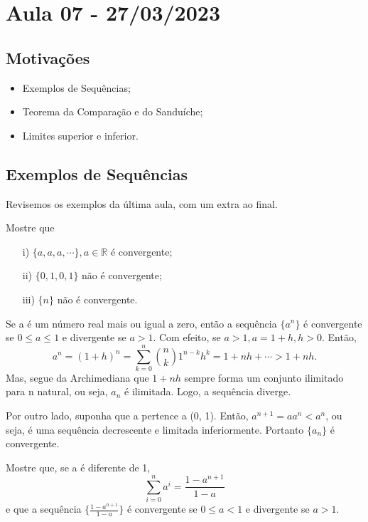 \documentclass[Analysis/analysis_notes.tex]{subfiles}
\begin{document}
\section{Aula 07 - 27/03/2023}
\subsection{Motiva\c c\~oes}
\begin{itemize}
	\item Exemplos de Sequ\^encias;
	\item Teorema da Compara\c c\~ao e do Sandu\'iche;
	\item Limites superior e inferior.
\end{itemize}
\subsection{Exemplos de Sequ\^encias}
Revisemos os exemplos da \'ultima aula, com um extra ao final.
\begin{example}
	Mostre que
	\begin{itemize}
		\item[i)] $\{a, a, a, \cdots\},a\in \mathbb{R}$ \'e convergente;
		\item[ii)] $\{0, 1, 0, 1\}$ n\~ao \'e convergente;
		\item[iii)] $\{n\}$ n\~ao \'e convergente.
	\end{itemize}
\end{example}
\begin{example}
	Se a \'e um n\'umero real mais ou igual a zero, ent\~ao a sequ\^encia $\{a^{n}\}$ \'e convergente se $0\leq{a}\leq{1}$ e divergente
	se $a > 1$. Com efeito, se $a > 1, a = 1 + h, h > 0$. Ent\~ao,
	$$
		a^{n} = (1+h)^{n} = \sum\limits_{k=0}^{n}\binom{n}{k}1^{n-k}h^{k} = 1 + nh + \cdots > 1 + nh.
	$$
	Mas, segue da Archimediana que $1 + nh$ sempre forma um conjunto ilimitado para n natural, ou seja, $a_{n}$ \'e ilimitada. Logo, a sequ\^encia
	diverge.

	Por outro lado, suponha que a pertence a (0, 1). Ent\~ao, $a^{n+1} = a a^{n} < a^{n}$, ou seja, \'e uma sequ\^encia decrescente e limitada inferiormente.
	Portanto $\{a_{n}\}$ \'e convergente.
\end{example}
\begin{example}
	Mostre que, se a \'e diferente de 1,
	$$
		\sum\limits_{i=0}^{n}a^{i} = \frac{1-a^{n+1}}{1-a}
	$$
	e que a sequ\^encia $\biggl\{\frac{1-a^{n+1}}{1-a}\biggr\}$ \'e convergente se $0\leq{a}<1$ e divergente se $a > 1$.
\end{example}
\end{document}
